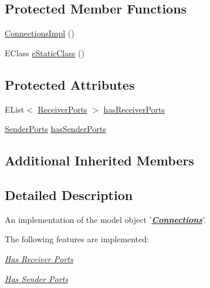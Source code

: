 \subsection*{Protected Member Functions}
\begin{DoxyCompactItemize}
\item 
\hyperlink{classshootingmachineemfmodel_1_1impl_1_1_connections_impl_af21db5524e49b6d1d4ea0fd56f34d479}{Connections\-Impl} ()
\item 
E\-Class \hyperlink{classshootingmachineemfmodel_1_1impl_1_1_connections_impl_ab05ed714d892feaaf558effdc19cbd04}{e\-Static\-Class} ()
\end{DoxyCompactItemize}
\subsection*{Protected Attributes}
\begin{DoxyCompactItemize}
\item 
E\-List$<$ \hyperlink{interfaceshootingmachineemfmodel_1_1_receiver_ports}{Receiver\-Ports} $>$ \hyperlink{classshootingmachineemfmodel_1_1impl_1_1_connections_impl_ab6f6e2590e9cc8a0476d968c5dd76823}{has\-Receiver\-Ports}
\item 
\hyperlink{interfaceshootingmachineemfmodel_1_1_sender_ports}{Sender\-Ports} \hyperlink{classshootingmachineemfmodel_1_1impl_1_1_connections_impl_a6813262fd753acf72690976a352f60cd}{has\-Sender\-Ports}
\end{DoxyCompactItemize}
\subsection*{Additional Inherited Members}


\subsection{Detailed Description}
An implementation of the model object '{\itshape {\bfseries \hyperlink{interfaceshootingmachineemfmodel_1_1_connections}{Connections}}}'.

The following features are implemented\-: 
\begin{DoxyItemize}
\item \hyperlink{classshootingmachineemfmodel_1_1impl_1_1_connections_impl_a103b66052688de23b26b3aab450c0cec}{{\itshape Has Receiver Ports}} 
\item \hyperlink{classshootingmachineemfmodel_1_1impl_1_1_connections_impl_ae75288578dc15b4f66454ee96b23ed0b}{{\itshape Has Sender Ports}} 
\end{DoxyItemize}

